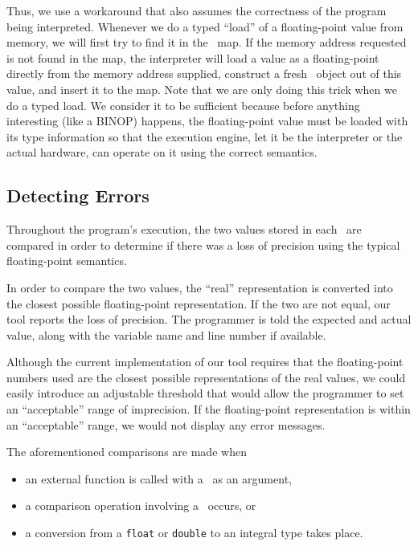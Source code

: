 Thus, we use a workaround that also assumes the correctness of the program being interpreted. Whenever we do a typed ``load'' of a floating-point value from memory, we will first try to find it in the \smartfloat~map. If the memory address requested is not found in the map, the interpreter will load a value as a floating-point directly from the memory address supplied, construct a fresh \smartfloat~object out of this value, and insert it to the map. Note that we are only doing this trick when we do a typed load. We consider it to be sufficient because before anything interesting (like a BINOP) happens, the floating-point value must be loaded with its type information so that the execution engine, let it be the interpreter or the actual hardware, can operate on it using the correct semantics.

\subsection{Detecting Errors}
\label{sec:detecting_errors}

Throughout the program's execution, the two values stored in each \smartfloat~are compared in order to determine if there was a loss of precision using the typical floating-point semantics. 

In order to compare the two values, the ``real'' representation is converted into the closest possible floating-point representation. If the two are not equal, our tool reports the loss of precision. The programmer is told the expected and actual value, along with the variable name and line number if available.

Although the current implementation of our tool requires that the floating-point numbers used are the closest possible representations of the real values, we could easily introduce an adjustable threshold that would allow the programmer to set an ``acceptable'' range of imprecision. If the floating-point representation is within an ``acceptable'' range, we would not display any error messages.

The aforementioned comparisons are made when

\begin{itemize}
\item an external function is called with a \smartfloat~as an argument,
\item a comparison operation involving a \smartfloat~occurs, or
\item a conversion from a \texttt{float} or \texttt{double} to an integral type takes place.
\end{itemize}

